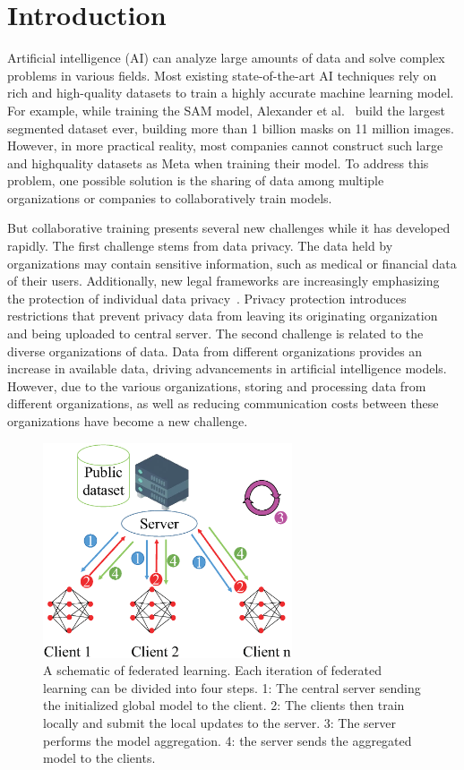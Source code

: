 \section{Introduction}
Artificial intelligence (AI) can analyze large amounts
of data and solve complex problems in various fields.
Most existing state-of-the-art AI techniques rely on
rich and high-quality datasets to train a highly accurate
machine learning model. For example, while training
the SAM model, Alexander et al.~\cite{kirillov2023segment} build the largest
segmented dataset ever, building more than 1 billion
masks on 11 million images. However, in more practical reality,
most companies cannot construct such large and highquality datasets as Meta when training their model. To
address this problem, one possible solution is the sharing
of data among multiple organizations or companies to
collaboratively train models.

But collaborative training presents several new challenges while it has developed rapidly.
The first challenge stems from data privacy. The data held
by organizations may contain sensitive information, such
as medical or financial data of their users. Additionally,
new legal frameworks are increasingly emphasizing the
protection of individual data privacy~\cite{voigt2017eu}. Privacy protection introduces restrictions that prevent privacy data from
leaving its originating organization and being uploaded
to central server. The second challenge is related to the
diverse organizations of data. Data from different organizations provides an increase in available data, driving
advancements in artificial intelligence models. However,
due to the various organizations, storing and processing
data from different organizations, as well as reducing communication costs between these organizations have
become a new challenge.

\begin{figure}[t]
    \centering
  
    \includegraphics[width=1.0\linewidth,height=2.5in]{output/fig1.eps}
     \caption{A schematic of federated learning.  
     Each iteration of federated learning can be divided into four steps.
     1: The central server sending the initialized global model to the client. 2: The
     clients then train locally and submit the local updates to the server. 3: The server performs the model aggregation.
     4: the server sends the aggregated model to the clients.}
     \label{fig1}
\end{figure}

